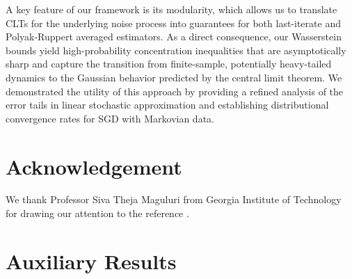 \documentclass[11pt]{article}
\begin{document}
A key feature of our framework is its modularity, which allows us to translate \nonasymptotic CLTs for the underlying noise process into guarantees for both last-iterate and Polyak-Ruppert averaged estimators. 
As a direct consequence, our Wasserstein bounds yield high-probability concentration inequalities that are asymptotically sharp and capture the transition from finite-sample, potentially heavy-tailed dynamics to the Gaussian behavior predicted by the central limit theorem. 
We demonstrated the utility of this approach by providing a refined analysis of the error tails in linear stochastic approximation and establishing distributional convergence rates for SGD with Markovian data.








\section*{Acknowledgement}
We thank Professor Siva Theja Maguluri from Georgia Institute of Technology for drawing our attention to the reference \citep{liu2023wassersteinpboundscentrallimit}.


\appendix
\section{Auxiliary Results}
\end{document}
